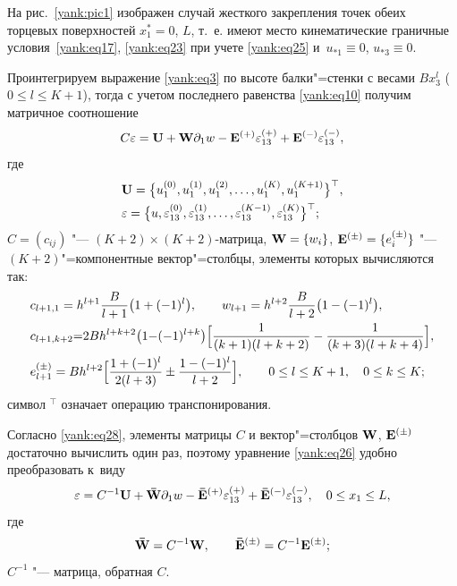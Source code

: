 \smallskip

\hypertarget{yan:rem:2}{}

\begin{remark}[2] На рис.~\ref{yank:pic1} изображен случай жесткого закрепления точек обеих торцевых поверхностей $x_1^\ast =0$, $L$, т.~е. имеют место кинематические граничные условия~\eqref{yank:eq17}, \eqref{yank:eq23} при учете \eqref{yank:eq25} и~$u_{\ast 1} \equiv 0$, $u_{\ast 3} \equiv 0$.
\end{remark}

\smallskip

Проинтегрируем выражение \eqref{yank:eq3} по высоте балки"=стенки с весами $Bx_3^l$
(${0\le l\le K+1}$), тогда с учетом последнего равенства \eqref{yank:eq10} получим
матричное соотношение
\begin{equation}
\label{yank:eq26}
C {\bf \varepsilon}= {\bf U}+{\bf W} \partial _1 w- {\bf E}^{(+)}\varepsilon _{13}^{(+)} + {\bf E}^{(-)}\varepsilon _{13}^{(-)},
\end{equation}
где
\begin{equation}
\label{yank:eq27}
\begin{aligned}
&{\bf U}=\bigl\{u_1^{(0)},u_1^{(1)},u_1^{(2)},\ldots,u_1^{(K)},u_1^{(K+1)} \bigr\}^\top,\\
&{\bf \varepsilon}=\bigl\{u,\varepsilon_{13}^{(0)},\varepsilon_{13}^{(1)},\ldots,\varepsilon _{13}^{(K-1)},\varepsilon _{13}^{(K)}\bigr\}^\top;
\end{aligned}
\end{equation}
$C= (c_{ij})$ "--- $(K+2) {\times} (K+2)$-матрица, 
${\bf W}= \{w_i \}$, ${\bf E}^{(\pm )}= \{e_i^{(\pm )} \}$ "--- $(K+2)$"=компонентные
вектор"=столбцы, элементы которых вычисляются так:
\begin{equation}
\label{yank:eq28}
\begin{aligned}
& c_{l+1,1} =h^{l+1}\frac{B}{l+1}\bigl(1+(-1)^l\bigr),\qquad w_{l+1} =h^{l+2}\frac{B}{l+2}\bigl(
1-(-1)^l\bigr), \\
& c_{l+1,k+2}{=}2Bh^{l+k+2}\bigl(1{-}({-}1)^{l+k} \bigr)
\Bigl[ \frac{1}{(k+1) (l+k+2)} - \frac{1}{(k+3) (l+k+4)} \Bigr], \\
& e_{l+1}^{(\pm )} =Bh^{l+2}\Bigl[\frac{1+(-1)^l}{2 (l+3)}\pm \frac{1- (-1)^l}{l+2}
\Bigr],\qquad 0\le l\le K+1,\quad 0\le k\le K;
\end{aligned}
\end{equation}
символ $^\top$  означает операцию транспонирования.

Согласно \eqref{yank:eq28}, элементы матрицы $C$ и вектор"=столбцов $\bf{W}$, ${\bf E}^{(\pm )}$ достаточно вычислить один раз, поэтому уравнение \eqref{yank:eq26} удобно
преобразовать к~виду
\begin{equation}
\label{yank:eq29}
{\bf \varepsilon }=C^{-1}{\bf U}+{\bf \bar {W}}\partial _1
w-{\bf \bar {E}}^{(+)}\varepsilon _{13}^{(+)} +{\bf \bar
{E}}^{(-)}\varepsilon _{13}^{(-)},\quad 0\le x_1 \le L,
\end{equation}
где
\begin{equation}
\label{yank:eq30}
{\bf \bar {W}}=C^{-1}{\bf W},\qquad {\bf \bar
{E}}^{(\pm )}=C^{-1} {\bf E}^{(\pm )};
\end{equation}
$C^{-1}$ "--- матрица, обратная $C$.

